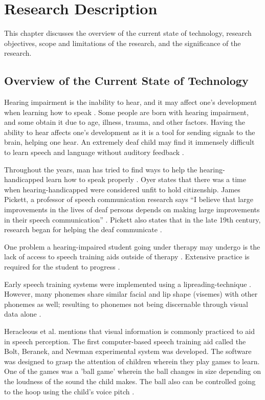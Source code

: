 \chapter{Research Description}
\label{sec:researchdesc}

This chapter discusses the overview of the current state of technology, research objectives, scope and limitations of the research, and the significance of the research.

\section{Overview of the Current State of Technology}
\label{sec:overview}

Hearing impairment is the inability to hear, and it may affect one's development when learning how to speak \cite{lasak:2014:HL}. Some people are born with hearing impairment, and some obtain it due to age, illness, trauma, and other factors. Having the ability to hear affects one's development as it is a tool for sending signals to the brain, helping one hear. An extremely deaf child may find it immensely difficult to learn speech and language without auditory feedback \cite{bernstein:1988:STA}.

Throughout the years, man has tried to find ways to help the hearing-handicapped learn how to speak properly \cite{oyer:1976:CHH}. Oyer \citeyear{oyer:1976:CHH} states that there was a time when hearing-handicapped were considered unfit to hold citizenship. James Pickett, a professor of speech communication research says “I believe that large improvements in the lives of deaf persons depends on making large improvements in their speech communication” \cite{connor:1971:SDC}. Pickett also states that in the late 19th century, research began for helping the deaf communicate \cite{connor:1971:SDC}.

One problem a hearing-impaired student going under therapy may undergo is the lack of access to speech training aids outside of therapy \cite{bernstein:1988:STA}. Extensive practice is required for the student to progress \cite{bernstein:1988:STA}.

Early speech training systems were implemented using a lipreading-technique \cite{heracleous:2010:CSA}. However, many phonemes share similar facial and lip shape (visemes) with other phonemes as well; resulting to phonemes not being discernable through visual data alone \cite{heracleous:2010:CSA}.

Heracleous et al. \citeyear{heracleous:2010:CSA} mentions that visual information is commonly practiced to aid in speech perception. The first computer-based speech training aid called the Bolt, Beranek, and Newman experimental system was developed. The software was designed to grasp the attention of children wherein they play games to learn. One of the games was a 'ball game' wherein the ball changes in size depending on the loudness of the sound the child makes. The ball also can be controlled going to the hoop using the child's voice pitch \cite{heracleous:2010:CSA}.

